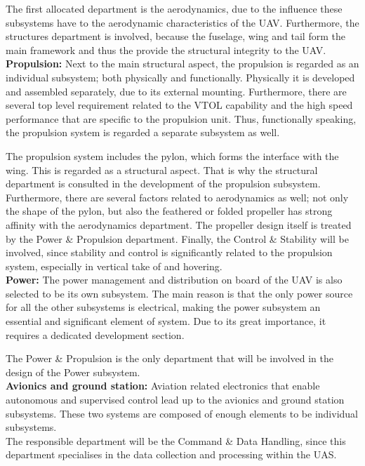The first allocated department is the aerodynamics, due to the influence these subsystems have to the aerodynamic characteristics of the UAV.  Furthermore, the structures department is involved, because the fuselage, wing and tail form the main framework and thus the provide the structural integrity to the UAV.\\

\noindent \textbf{Propulsion:} Next to the main structural aspect, the propulsion is regarded as an individual subsystem; both physically and functionally. Physically it is developed and assembled separately, due to its external mounting. Furthermore, there are several top level requirement related to the VTOL capability and the high speed performance that are specific to the propulsion unit. Thus, functionally speaking, the propulsion system is regarded a separate subsystem as well.

The propulsion system includes the pylon, which forms the interface with the wing. This is regarded as a structural aspect. That is why the structural department is consulted in the development of the propulsion subsystem. Furthermore, there are several factors related to aerodynamics as well; not only the shape of the pylon, but also the feathered or folded propeller has strong affinity with the aerodynamics department. The propeller design itself is treated by the Power \& Propulsion department. Finally, the Control \& Stability will be involved, since stability and control is significantly related to the propulsion system, especially in vertical take of and hovering.\\

\noindent \textbf{Power:} The power management and distribution on board of the UAV is also selected to be its own subsystem. The main reason is that the only power source for all the other subsystems is electrical, making the power subsystem an essential and significant element of system. Due to its great importance, it requires a dedicated development section.

The Power \& Propulsion is the only department that will be involved in the design of the Power subsystem.\\

\noindent \textbf{Avionics and ground station:} Aviation related electronics that enable autonomous and supervised control lead up to the avionics and ground station subsystems. These two systems are composed of enough elements to be individual subsystems. \\ \indent The responsible department will be the Command \& Data Handling, since this department specialises in the data collection and processing within the UAS.\\

